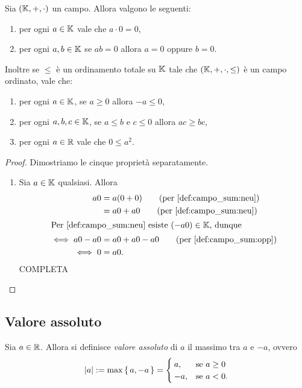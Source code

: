 \begin{proposition}

    Sia $(\K, +, \cdot)$ un campo. Allora valgono le seguenti:
    \begin{enumerate}[label={(\roman*)}]
        \item per ogni $a \in \K$ vale che $a \cdot 0 = 0$,
        \item per ogni $a, b \in \K$ se $ab = 0$ allora $a = 0$ oppure $b = 0$.
    \end{enumerate}

    Inoltre se $\leq$ è un ordinamento totale su $\K$ tale che $(\K, +, \cdot, \leq)$ è un campo ordinato, vale che:
    \begin{enumerate}[label={(\roman*)}, start=3]
        \item per ogni $a \in \K$, se $a \geq 0$ allora $-a \leq 0$,
        \item per ogni $a, b, c \in \K$, se $a \leq b$ e $c \leq 0$ allora $ac \geq bc$,
        \item per ogni $a \in \R$ vale che $0 \leq a^2$.
    \end{enumerate}
\end{proposition}
\begin{proof}
    Dimostriamo le cinque proprietà separatamente.
    \begin{enumerate}[label={(\roman*)}]
        \item Sia $a \in \K$ qualsiasi. Allora \begin{align*}
            a0 &= a(0 + 0) \tag{per \ref{def:campo_sum:neu}}\\
            &= a0 + a0 \tag{per \ref{def:campo_sum:neu}}\\
            \intertext{Per \ref{def:campo_sum:neu} esiste $(-a0) \in \K$, dunque}
            \iff a0 - a0 &= a0 + a0 - a0 \tag{per \ref{def:campo_sum:opp}}\\
            \iff 0 &= a0.
        \end{align*}
        COMPLETA
    \end{enumerate}
\end{proof}

\subsection{Valore assoluto}

\begin{definition}
    Sia $a \in \R$. Allora si definisce \emph{valore assoluto} di $a$ il massimo tra $a$ e $-a$, ovvero \begin{equation}
        \abs*{a} \deq \max \set{a, -a} = \begin{cases}
            a, &\text{se } a \geq 0\\
            -a, &\text{se } a < 0.
        \end{cases}
    \end{equation}
\end{definition}

